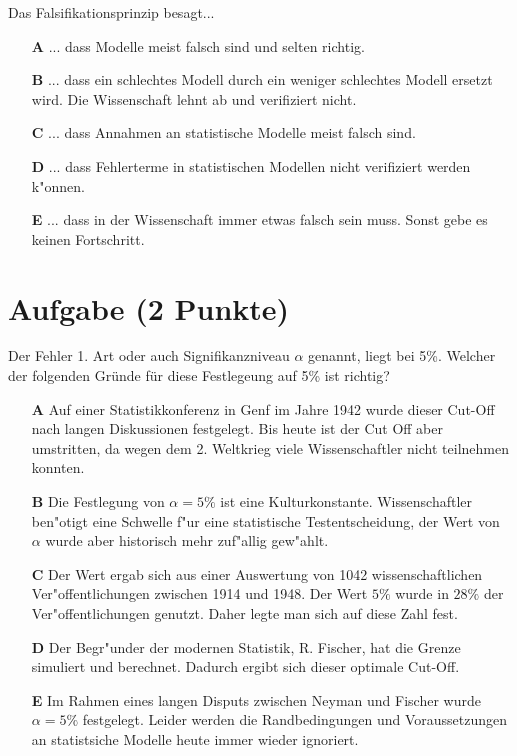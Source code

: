 \documentclass[a4paper, 10pt]{scrartcl}\usepackage[]{graphicx}\usepackage[]{xcolor}
\begin{document}
Das Falsifikationsprinzip besagt... 



\begin{enumerate}
\item [\textbf{A} \msquare] ... dass Modelle meist falsch sind und selten richtig.
\item [\textbf{B} \msquare] ... dass ein schlechtes Modell durch ein weniger schlechtes Modell ersetzt wird. Die Wissenschaft lehnt ab und verifiziert nicht.
\item [\textbf{C} \msquare] ... dass Annahmen an statistische Modelle meist falsch sind.
\item [\textbf{D} \msquare] ... dass Fehlerterme in statistischen Modellen nicht verifiziert werden k{"o}nnen.
\item [\textbf{E} \msquare] ... dass in der Wissenschaft immer etwas falsch sein muss. Sonst gebe es keinen Fortschritt.
\end{enumerate}

\section{Aufgabe \hfill (2 Punkte)}

Der Fehler 1. Art oder auch Signifikanzniveau $\alpha$ genannt, liegt bei
5\%. Welcher der folgenden Gr{\"u}nde f{\"u}r diese Festlegeung auf 5\% ist richtig?



\begin{enumerate}
\item [\textbf{A} \msquare] Auf einer Statistikkonferenz in Genf im Jahre 1942 wurde dieser Cut-Off nach langen Diskussionen festgelegt. Bis heute ist der Cut Off aber umstritten, da wegen dem 2. Weltkrieg viele Wissenschaftler nicht teilnehmen konnten.
\item [\textbf{B} \msquare] Die Festlegung von $\alpha = 5\%$ ist eine Kulturkonstante. Wissenschaftler ben{"o}tigt eine Schwelle f{"u}r eine statistische Testentscheidung, der Wert von $\alpha$ wurde aber historisch mehr zuf{"a}llig gew{"a}hlt.
\item [\textbf{C} \msquare] Der Wert ergab sich aus einer Auswertung von 1042 wissenschaftlichen Ver{"o}ffentlichungen zwischen 1914 und 1948. Der Wert $5\%$ wurde in $28\%$ der Ver{"o}ffentlichungen genutzt. Daher legte man sich auf diese Zahl fest.
\item [\textbf{D} \msquare] Der Begr{"u}nder der modernen Statistik, R. Fischer, hat die Grenze simuliert und berechnet. Dadurch ergibt sich dieser optimale Cut-Off.
\item [\textbf{E} \msquare] Im Rahmen eines langen Disputs zwischen Neyman und Fischer wurde $\alpha = 5\%$ festgelegt. Leider werden die Randbedingungen und Voraussetzungen an statistsiche Modelle heute immer wieder ignoriert.
\end{enumerate}
\end{document}
